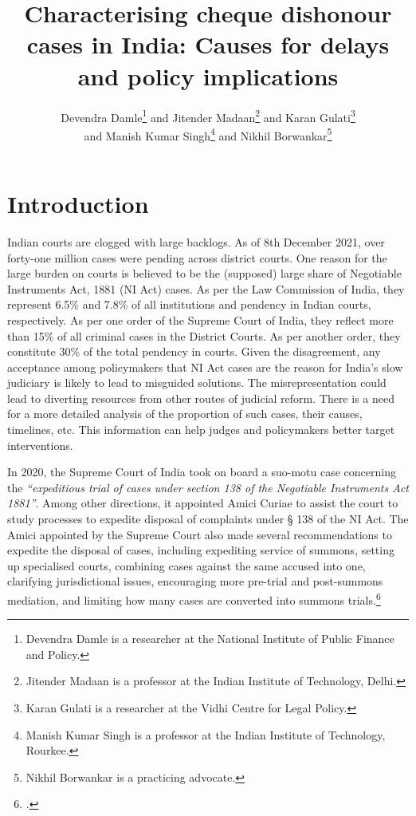 \documentclass[11pt,a4paper]{article}
\title{\vspace{-1.5cm}Characterising cheque dishonour cases in India: Causes for delays and policy implications}
\author{Devendra Damle\thanks{Devendra Damle is a researcher at the National Institute of Public Finance and Policy.} and Jitender Madaan\thanks{Jitender Madaan is a professor at the Indian Institute of Technology, Delhi.} and Karan Gulati\thanks{Karan Gulati is a researcher at the Vidhi Centre for Legal Policy.}\\ and Manish Kumar Singh\thanks{Manish Kumar Singh is a professor at the Indian Institute of Technology, Rourkee.} and Nikhil Borwankar\thanks{Nikhil Borwankar is a practicing advocate.}}
\date{\vspace{-1cm}}
\begin{document}
\maketitle

\section{Introduction}

Indian courts are clogged with large backlogs. As of 8th December 2021, over forty-one million cases were pending across district courts. One reason for the large burden on courts is believed to be the (supposed) large share of Negotiable Instruments Act, 1881 (NI Act) cases. As per the Law Commission of India, they represent 6.5\% and 7.8\% of all institutions and pendency in Indian courts, respectively. As per one order of the Supreme Court of India, they reflect more than 15\% of all criminal cases in the District Courts. As per another order, they constitute 30\% of the total pendency in courts. Given the disagreement, any acceptance among policymakers that NI Act cases are the reason for India’s slow judiciary is likely to lead to misguided solutions. The misrepresentation could lead to diverting resources from other routes of judicial reform. There is a need for a more detailed analysis of the proportion of such cases, their causes, timelines, etc. This information can help judges and policymakers better target interventions.

In 2020, the Supreme Court of India took on board a suo-motu case concerning the \emph{``expeditious trial of cases under section 138 of the Negotiable Instruments Act 1881''}. Among other directions, it appointed Amici Curiae to assist the court to study processes to expedite disposal of complaints under § 138 of the NI Act. The Amici appointed by the Supreme Court also made several recommendations to expedite the disposal of cases, including expediting service of summons, setting up specialised courts, combining cases against the same accused into one, clarifying jurisdictional issues, encouraging more pre-trial and post-summons mediation, and limiting how many cases are converted into summons trials.\footcite{amicus2020_submission}
\end{document}
